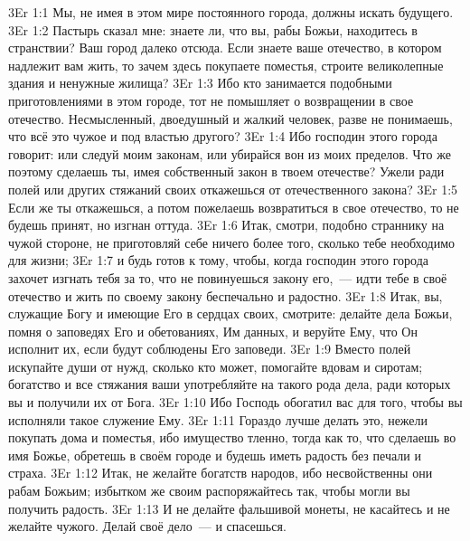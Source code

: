 \vs 3Er 1:1
Мы, не имея в этом мире постоянного города, должны искать будущего.
\vs 3Er 1:2
Пастырь сказал мне: знаете
ли, что вы, рабы Божьи, находитесь в странствии? Ваш город далеко отсюда. Если
знаете ваше отечество, в котором надлежит вам жить, то зачем здесь покупаете
поместья, строите великолепные здания и ненужные жилища?
\vs 3Er 1:3
Ибо кто занимается подобными приготовлениями в этом городе, тот не помышляет о
возвращении в свое отечество. Несмысленный, двоедушный и жалкий человек, разве
не понимаешь, что всё это чужое и под властью другого?
\vs 3Er 1:4
Ибо господин этого города
говорит: или следуй моим законам, или убирайся вон из моих пределов. Что же
поэтому сделаешь ты, имея собственный закон в твоем отечестве? Ужели ради
полей или других стяжаний своих откажешься от отечественного закона?
\vs 3Er 1:5
Если же ты откажешься, а
потом пожелаешь возвратиться в свое отечество, то не будешь принят, но изгнан
оттуда.
\vs 3Er 1:6
Итак, смотри, подобно
страннику на чужой стороне, не приготовляй себе ничего более того, сколько
тебе необходимо для жизни;
\vs 3Er 1:7
и будь готов к тому,
чтобы, когда господин этого города захочет изгнать тебя за то, что не
повинуешься закону его,~--- идти тебе в своё отечество и жить по своему закону
беспечально и радостно.
\vs 3Er 1:8
Итак, вы, служащие Богу и
имеющие Его в сердцах своих, смотрите: делайте дела Божьи, помня о заповедях
Его и обетованиях, Им данных, и веруйте Ему, что Он исполнит их, если будут
соблюдены Его заповеди.
\vs 3Er 1:9
Вместо полей искупайте
души от нужд, сколько кто может, помогайте вдовам и сиротам; богатство и все
стяжания ваши употребляйте на такого рода дела, ради которых вы и получили их
от Бога.
\vs 3Er 1:10
Ибо Господь обогатил вас
для того, чтобы вы исполняли такое служение Ему.
\vs 3Er 1:11
Гораздо лучше делать это,
нежели покупать дома и поместья, ибо имущество тленно, тогда как то, что
сделаешь во имя Божье, обретешь в своём городе и будешь иметь радость без
печали и страха.
\vs 3Er 1:12
Итак, не желайте богатств
народов, ибо несвойственны они рабам Божьим; избытком же своим распоряжайтесь
так, чтобы могли вы получить радость.
\vs 3Er 1:13
И не делайте фальшивой
монеты, не касайтесь и не желайте чужого. Делай своё дело~--- и спасешься.

